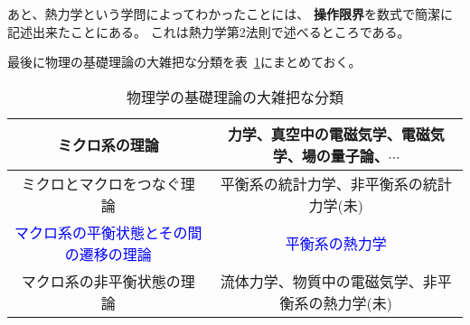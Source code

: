 \documentclass{jsarticle}
\newcommand{\blue}[1]{\textcolor{blue}{#1}}
\begin{document}
あと、熱力学という学問によってわかったことには、
\textbf{操作限界}を数式で簡潔に記述出来たことにある。
これは熱力学第2法則で述べるところである。

最後に物理の基礎理論の大雑把な分類を表~\ref{table:classification}にまとめておく。
\begin{table}[H]
\begin{center}
\caption{物理学の基礎理論の大雑把な分類}
\label{table:classification}
\begin{tabular}{|c|c|}\hline
ミクロ系の理論 & 力学、真空中の電磁気学、電磁気学、場の量子論、$\cdots$ \\
\hline
ミクロとマクロをつなぐ理論 & 平衡系の統計力学、非平衡系の統計力学(未) \\
\hline
\blue{マクロ系の平衡状態とその間の遷移の理論} & \blue{平衡系の熱力学} \\
\hline
マクロ系の非平衡状態の理論 & 流体力学、物質中の電磁気学、非平衡系の熱力学(未)\\ 
\hline
\end{tabular}
\end{center}
\end{table}
\end{document}
